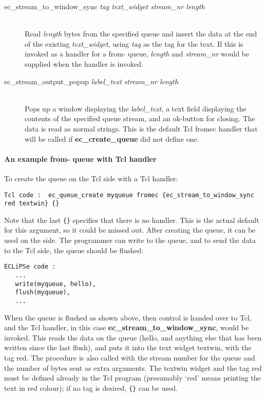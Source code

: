 \begin{description}
\item[ec_stream_to_window_sync {\it tag text_widget stream_nr length}]\ \\
        Read {\it length\/} bytes from the specified queue and insert the data
        at the end of the existing {\it text_widget}, using {\it tag} as the tag
        for the text. If this is invoked as a handler for a from-{\eclipse}
        queue, {\it length\/} and {\it stream_nr\/} would be supplied when
        the  handler is invoked.


\item[ec_stream_output_popup {\it label_text stream_nr length}]\ \\
        Pops up a window displaying the {\it label_text},
        a text field displaying the contents of the specified queue stream,
        and an ok-button for closing. The data is read as normal
        strings. This is the default Tcl fromec handler that will be called
        if {\bf ec_create_queue} did not define one.

\end{description} 

\paragraph{An example from-{\eclipse} queue with Tcl handler}

To create the queue on the Tcl side with a Tcl handler:

\begin{verbatim}
Tcl code :  ec_queue_create myqueue fromec {ec_stream_to_window_sync red textwin} {}
\end{verbatim}

Note that the last \verb'{}' specifies that there is no {\eclipse}
handler. This is the actual default for this argument, so it could be
missed out. After creating the queue, it can be used on the {\eclipse}
side. The programmer can write to the queue, and to send the data to the
Tcl side, the queue should be flushed:

\begin{verbatim}
ECLiPSe code :
   ...
   write(myqueue, hello),
   flush(myqueue),
   ...
\end{verbatim}

When the queue is flushed as shown above, then control is handed over to
Tcl, and the Tcl handler, in this case {\bf ec_stream_to_window_sync},
would be invoked. This reads the data on the queue (hello, and anything
else that has been written since the last flush), and puts it into the text
widget textwin, with the tag red. The procedure is also called with the
{\eclipse} stream number for the queue and the number of bytes sent as extra
arguments. The textwin widget and the tag red must
be defined already in the Tcl program (presumably  `red' means printing the
text in red colour); if no tag is desired, \verb'{}' can be used. 

